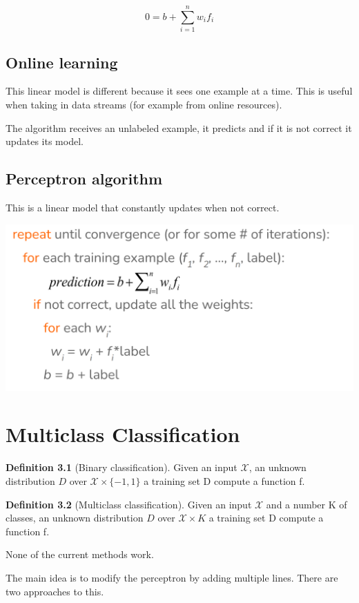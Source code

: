 \documentclass[oneside]{book}
\theoremstyle{definition}
\newtheorem{definition}{Definition}[section]
\begin{document}
\[
0 = b+ \sum_{i=1}^{n} w_if_i
\]

\section{Online learning}

This linear model is different because it sees one example at a time. This is useful when taking in data streams (for example from online resources).

The algorithm receives an unlabeled example, it predicts and if it is not correct it updates its model.

\section{Perceptron algorithm}
This is a linear model that constantly updates when not correct.

\includegraphics[scale=0.25]{perceptron}
\chapter{Multiclass Classification}
\begin{definition}[Binary classification]
	Given an input $\mathscr{X}$, an unknown distribution $D$ over $\mathscr{X}\times \{-1,1\}$
	a training set D compute a function f.
\end{definition}

\begin{definition}[Multiclass classification]
	Given an input $\mathscr{X}$ and a number K of classes, an unknown distribution $D$ over $\mathscr{X}\times K$
	a training set D compute a function f.
\end{definition}

None of the current methods work.

The main idea is to modify the perceptron by adding multiple lines. There are two approaches to this.
\end{document}
